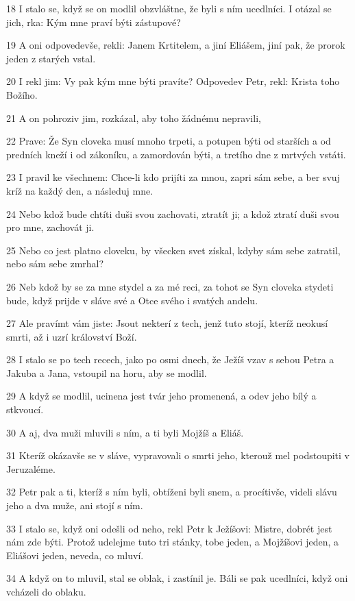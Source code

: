 \par 18 I stalo se, když se on modlil obzvláštne, že byli s ním ucedlníci. I otázal se jich, rka: Kým mne praví býti zástupové?
\par 19 A oni odpovedevše, rekli: Janem Krtitelem, a jiní Eliášem, jiní pak, že prorok jeden z starých vstal.
\par 20 I rekl jim: Vy pak kým mne býti pravíte? Odpovedev Petr, rekl: Krista toho Božího.
\par 21 A on pohroziv jim, rozkázal, aby toho žádnému nepravili,
\par 22 Prave: Že Syn cloveka musí mnoho trpeti, a potupen býti od starších a od predních kneží i od zákoníku, a zamordován býti, a tretího dne z mrtvých vstáti.
\par 23 I pravil ke všechnem: Chce-li kdo prijíti za mnou, zapri sám sebe, a ber svuj kríž na každý den, a následuj mne.
\par 24 Nebo kdož bude chtíti duši svou zachovati, ztratít ji; a kdož ztratí duši svou pro mne, zachovát ji.
\par 25 Nebo co jest platno cloveku, by všecken svet získal, kdyby sám sebe zatratil, nebo sám sebe zmrhal?
\par 26 Neb kdož by se za mne stydel a za mé reci, za tohot se Syn cloveka stydeti bude, když prijde v sláve své a Otce svého i svatých andelu.
\par 27 Ale pravímt vám jiste: Jsout nekterí z tech, jenž tuto stojí, kteríž neokusí smrti, až i uzrí království Boží.
\par 28 I stalo se po tech recech, jako po osmi dnech, že Ježíš vzav s sebou Petra a Jakuba a Jana, vstoupil na horu, aby se modlil.
\par 29 A když se modlil, ucinena jest tvár jeho promenená, a odev jeho bílý a stkvoucí.
\par 30 A aj, dva muži mluvili s ním, a ti byli Mojžíš a Eliáš.
\par 31 Kteríž okázavše se v sláve, vypravovali o smrti jeho, kterouž mel podstoupiti v Jeruzaléme.
\par 32 Petr pak a ti, kteríž s ním byli, obtíženi byli snem, a procítivše, videli slávu jeho a dva muže, ani stojí s ním.
\par 33 I stalo se, když oni odešli od neho, rekl Petr k Ježíšovi: Mistre, dobrét jest nám zde býti. Protož udelejme tuto tri stánky, tobe jeden, a Mojžíšovi jeden, a Eliášovi jeden, neveda, co mluví.
\par 34 A když on to mluvil, stal se oblak, i zastínil je. Báli se pak ucedlníci, když oni vcházeli do oblaku.
